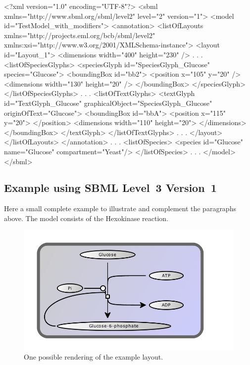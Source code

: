 \label{example:textglyph}
\begin{example}
<?xml version="1.0" encoding="UTF-8"?>
<sbml xmlns="http://www.sbml.org/sbml/level2" level="2" version="1">
  <model id="TestModel_with_modifiers">
    <annotation>
     <listOfLayouts xmlns="http://projects.eml.org/bcb/sbml/level2"
              xmlns:xsi="http://www.w3.org/2001/XMLSchema-instance">
      <layout id="Layout_1">
        <dimensions width="400" height="230" />
                .
                .
                .
        <listOfSpeciesGlyphs>
          <speciesGlyph id="SpeciesGlyph_Glucose" species="Glucose">
            <boundingBox id="bb2">
              <position x="105" y="20" />
              <dimensions width="130" height="20" />
            </boundingBox>
          </speciesGlyph>
        </listOfSpeciesGlyphs>  
                .
                .
                .
        <listOfTextGlyphs>
          <textGlyph id="TextGlyph_Glucose" graphicalObject="SpeciesGlyph_Glucose"
                     originOfText="Glucose">
            <boundingBox id="bbA">
              <position x="115" y="20">
              </position>
              <dimensions width="110" height="20">
              </dimensions>
            </boundingBox>
          </textGlyph>
        </listOfTextGlyphs>  
            .
            .
            .
      </layout>
     </listOfLayouts>
    </annotation>    
         .
         .
         .
    <listOfSpecies>
      <species id="Glucose" name="Glucose" compartment="Yeast"/>
    </listOfSpecies>
       .
       .
       .  
  </model>
</sbml>
\end{example}

\subsection{Example using SBML Level~3 Version~1}
Here a small complete example to illustrate and complement the paragraphs above. The model consists of the Hexokinase reaction.

\begin{center}
\begin{figure}[h!]
\includegraphics{figures/layout-spec-example}
\caption{One possible rendering of the example layout.}
\end{figure}
\end{center}

